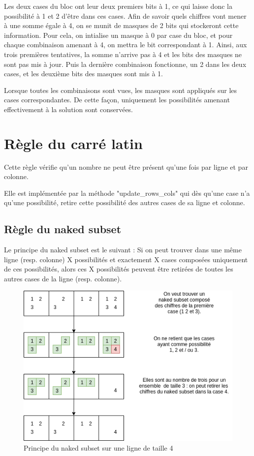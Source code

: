 \documentclass[1]{report}
\begin{document}
Les deux cases du bloc ont leur deux premiers bits à 1, ce qui laisse donc la possibilité à 1 et 2 d'être dans ces cases. Afin de savoir quels chiffres vont mener à une somme égale à 4, on se munit de masques de 2 bits qui stockeront cette information. Pour cela, on intialise un masque à 0 par case du bloc, et pour chaque combinaison amenant à 4, on mettra le bit correspondant à 1. Ainsi, aux trois premières tentatives, la somme n'arrive pas à 4 et les bits des masques ne sont pas mis à jour. Puis la dernière combinaison fonctionne, un 2 dans les deux cases, et les deuxième bits des masques sont mis à 1.\par
Lorsque toutes les combinaisons sont vues, les masques sont appliqués sur les cases correspondantes. De cette façon, uniquement les possibilités amenant effectivement à la solution sont conservées.


\section{Règle du carré latin}

Cette règle vérifie qu'un nombre ne peut être présent qu'une fois par ligne et par colonne.\par
Elle est implémentée par la méthode "update\_rows\_cols" qui dès qu'une case n'a qu'une possibilité, retire cette possibilité des autres cases de sa ligne et colonne.

\subsection{Règle du naked subset}

Le principe du naked subset est le suivant : Si on peut trouver dans une m\^eme ligne (resp. colonne) X possibilités et exactement X cases composées uniquement de ces possibilités, alors ces X possibilités peuvent être retirées de toutes les autres cases de la ligne (resp. colonne).

\begin{figure}[H]
\centering
   \includegraphics[scale=0.45]{naked_subset.png}
   \caption{Principe du naked subset sur une ligne de taille 4}
\end{figure}
\end{document}
